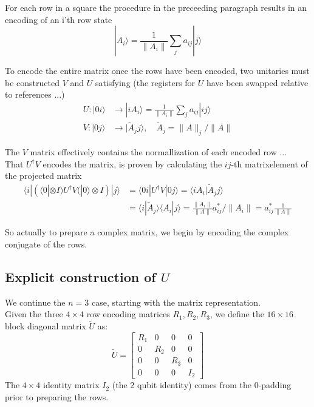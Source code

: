 \documentclass[11pt]{article}
\begin{document}
For each row in a square the procedure in the preceeding paragraph results in an encoding of an i'th row state 
$$
|A_i \rangle = \frac{1}{\|A_i\|} \sum_j a_{ij} |j\rangle
$$

To encode the entire matrix once the rows have been encoded, two unitaries must be constructed $V$ and $U$ satisfying (the registers for $U$ have been swapped relative to references ...)
 \begin{align*}
    U : |0i \rangle & \to |i A_i \rangle = \frac{1}{\|A_i\|} \sum_j a_{ij} |ij\rangle \\
    V : |0j \rangle & \to |\tilde{A}_j j\rangle, \quad \tilde{A}_j = \|A\|_j / \|A\|
\end{align*}

The $V$ matrix effectively contains the normallization of each encoded row ...\\

That $U^\dagger V$ encodes the matrix, is proven by calculating the $ij$-th matrixelement of the projected matrix
 \begin{align*}
        \langle i| (\langle 0| \otimes I) U^\dagger V (|0\rangle \otimes I) |j\rangle &= \langle 0i| U^\dagger V |0j\rangle = \langle i A_i | \tilde{A}_j j \rangle \\
        &= \langle i | \tilde{A}_j \rangle \langle A_i | j \rangle = \frac{\|A_i\|}{\|A\|} a_{ij}^* / \|A_i\| = a_{ij}^* \frac{1}{\|A\|}
    \end{align*}

So actually to prepare a complex matrix, we begin by encoding the complex conjugate of the rows. \\


\subsection*{Explicit construction of $U$}

We continue the $n=3$ case, starting with the matrix representation. \\

Given the three $4 \times 4$ row encoding matrices $R_1, R_2, R_3$, we define the $16 \times 16$ block diagonal matrix $\tilde{U}$ as:
\[
\tilde{U} = \begin{bmatrix}
R_1 & 0 & 0 & 0 \\
0 & R_2 & 0 & 0 \\
0 & 0 & R_3 & 0 \\
0 & 0 & 0 & I_2
\end{bmatrix}
\]
The $4\times4$ identity matrix $I_2$ (the 2 qubit identity) comes from the $0$-padding prior to preparing the rows. \\
\end{document}
